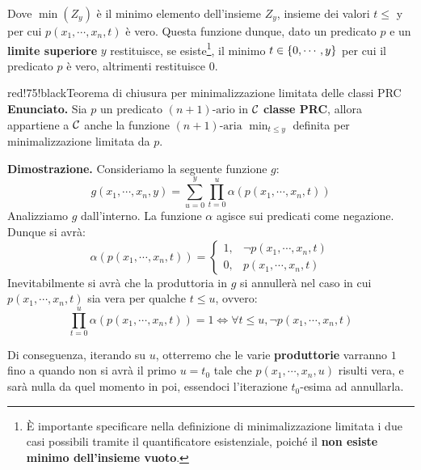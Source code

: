 Dove \(\min(Z_y)\) è il minimo elemento dell'insieme \(Z_y\), insieme dei valori \(t\leq\) y per cui \(p(x_1,\cdots,x_n,t)\) è vero.
Questa funzione dunque, dato un predicato \(p\) e un \textbf{limite superiore} \(y\) restituisce, se esiste\footnote{È importante specificare nella definizione di minimalizzazione limitata i due casi possibili tramite il quantificatore esistenziale, poiché il \textbf{non esiste minimo dell'insieme vuoto}.}, il minimo \(t \in \displaystyle{\left\{{0, \cdots, y}\right\}}\) per cui il predicato \(p\) è vero, altrimenti restituisce \(0\).

\newpage

\begin{halfframedbox} {red!75!black}{Teorema di chiusura per minimalizzazione limitata delle classi PRC}\label{Teorema di chiusura minimalizzazione limitata delle classi PRC}
  \textbf{Enunciato. } Sia \(p\) un predicato \((n+1)\text{-ario}\) in \(\mathcal{C}\) \textbf{classe PRC}, allora appartiene a \(\mathcal{C}\) anche la funzione \((n+1)\text{-aria}\) \(\min_{t\leq y}\) definita per minimalizzazione limitata da \(p\).

  \begin{center}
    \textcolor{red!75!black}{\hdashrule[0.5ex]{18cm}{1pt}{3mm 3pt 1mm 2pt}}
  \end{center}

  \textbf{Dimostrazione. } Consideriamo la seguente funzione \(g\):
  \begin{equation}
    g(x_1,\cdots,x_n,y)=\sum_{u=0}^y\prod_{t=0}^{u}\alpha(p(x_1,\cdots,x_n,t))
  \end{equation}
  Analizziamo \(g\) dall'interno. La funzione \(\alpha\) agisce sui predicati come negazione. Dunque si avrà:
  \begin{equation}
    \alpha(p(x_1,\cdots,x_n,t))= \begin{cases}
                                1, & \neg p(x_1,\cdots,x_n,t)\\
                                0, & p(x_1,\cdots,x_n,t)
                              \end{cases}
  \end{equation}
  Inevitabilmente si avrà che la produttoria in \(g\) si annullerà nel caso in cui \(p(x_1,\cdots,x_n,t)\) sia vera per qualche \(t\leq u\), ovvero:
  \begin{equation}
    \prod_{t=0}^{u}\alpha(p(x_1,\cdots,x_n,t))=1\iff\forall t \leq u, \neg p(x_1,\cdots,x_n,t)
  \end{equation}

  Di conseguenza, iterando su \(u\), otterremo che le varie \textbf{produttorie} varranno \(1\) fino a quando non si avrà il primo \(u=t_0\) tale che \(p(x_1,\cdots,x_n,u)\) risulti vera, e sarà nulla da quel momento in poi, essendoci l'iterazione \(t_0\)-esima ad annullarla.


\end{halfframedbox}
